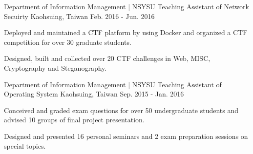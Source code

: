\begin{cventries}

\cventry
{Department of Information Management | NSYSU} %
{Teaching Assistant of Network Secuirty} %
{Kaohsuing, Taiwan} %
{Feb. 2016 - Jun. 2016} %
{ %
\begin{cvitems}
\item {Deployed and maintained a CTF platform by using Docker and organized a CTF competition for over 30 graduate students.}
\item {Designed, built and collected over 20 CTF challenges in Web, MISC, Cryptography and Steganography.}
\end{cvitems}
}


\cventry
{Department of Information Management | NSYSU} %
{Teaching Assistant of Operating System} %
{Kaohsuing, Taiwan} %
{Sep. 2015 - Jan. 2016} %
{ %
\begin{cvitems}
\item {Conceived and graded exam questions for over 50 undergraduate students and advised 10 groups of final project presentation.}
\item {Designed and presented 16 personal seminars and 2 exam preparation sessions on special topics.}
\end{cvitems}
}

\end{cventries}
